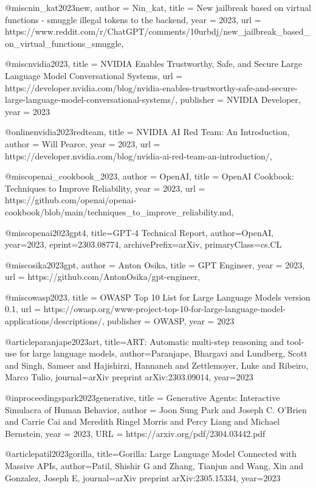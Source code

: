 @misc{nin_kat2023new,
    author = {Nin_kat},
    title = {New jailbreak based on virtual functions - smuggle illegal tokens to the backend},
    year = {2023},
    url = {https://www.reddit.com/r/ChatGPT/comments/10urbdj/new_jailbreak_based_on_virtual_functions_smuggle},
}

@misc{nvidia2023,
  title = {NVIDIA Enables Trustworthy, Safe, and Secure Large Language Model Conversational Systems},
  url = {https://developer.nvidia.com/blog/nvidia-enables-trustworthy-safe-and-secure-large-language-model-conversational-systems/},
  publisher = {NVIDIA Developer},
  year = {2023}
}

@online{nvidia2023redteam,
  title = {NVIDIA AI Red Team: An Introduction},
  author = {Will Pearce},
  year = {2023},
  url = {https://developer.nvidia.com/blog/nvidia-ai-red-team-an-introduction/},
}

@misc{openai_cookbook_2023,
  author = {OpenAI},
  title = {OpenAI Cookbook: Techniques to Improve Reliability},
  year = {2023},
  url = {https://github.com/openai/openai-cookbook/blob/main/techniques_to_improve_reliability.md},
}

@misc{openai2023gpt4,
      title={GPT-4 Technical Report},
      author={OpenAI},
      year={2023},
      eprint={2303.08774},
      archivePrefix={arXiv},
      primaryClass={cs.CL}
}

@misc{osika2023gpt,
  author = {Anton Osika},
  title = {GPT Engineer},
  year = {2023},
  url = {https://github.com/AntonOsika/gpt-engineer},
}

@misc{owasp2023,
  title = {OWASP Top 10 List for Large Language Models version 0.1},
  url = {https://owasp.org/www-project-top-10-for-large-language-model-applications/descriptions/},
  publisher = {OWASP},
  year = {2023}
}

@article{paranjape2023art,
  title={ART: Automatic multi-step reasoning and tool-use for large language models},
  author={Paranjape, Bhargavi and Lundberg, Scott and Singh, Sameer and Hajishirzi, Hannaneh and Zettlemoyer, Luke and Ribeiro, Marco Tulio},
  journal={arXiv preprint arXiv:2303.09014},
  year={2023}
}

@inproceedings{park2023generative,
title	= {Generative Agents: Interactive Simulacra of Human Behavior},
author	= {Joon Sung Park and Joseph C. O'Brien and Carrie Cai and Meredith Ringel Morris and Percy Liang and Michael Bernstein},
year	= {2023},
URL	= {https://arxiv.org/pdf/2304.03442.pdf}
}

@article{patil2023gorilla,
  title={Gorilla: Large Language Model Connected with Massive APIs},
  author={Patil, Shishir G and Zhang, Tianjun and Wang, Xin and Gonzalez, Joseph E},
  journal={arXiv preprint arXiv:2305.15334},
  year={2023}
}

